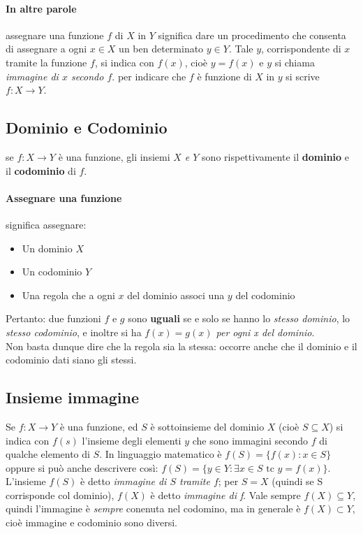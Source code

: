 \documentclass[12pt, a4paper, openany]{book}
\begin{document}
\paragraph{In altre parole} assegnare una funzione $f$ di $X$ in $Y$ significa dare un procedimento che consenta di assegnare a ogni $x \in X$ un ben determinato $y \in Y$. Tale $y$, corrispondente di $x$ tramite la funzione $f$, si indica con $f(x)$, cioè $y = f(x)$ e $y$ si chiama \emph{immagine di $x$ secondo $f$}. per indicare che $f$ è funzione di $X$ in $y$ si scrive $f: X \rightarrow Y$.

\subsection{Dominio e Codominio}
se $f: X \rightarrow Y$ è una funzione, gli insiemi \emph{$X$ e $Y$} sono rispettivamente il \textbf{dominio} e il \textbf{codominio} di $f$.
\paragraph{Assegnare una funzione} significa assegnare:
\begin{itemize}
    \item Un dominio $X$
    \item Un codominio $Y$
    \item Una regola che a ogni $x$ del dominio associ una $y$ del codominio
\end{itemize}
Pertanto: due funzioni $f$ e $g$ sono \textbf{uguali} se e solo se hanno lo \emph{stesso dominio}, lo\emph{ stesso codominio}, e inoltre si ha \emph{$f(x) = g(x)$ per ogni x del dominio}.\\
Non basta dunque dire che la regola sia la stessa: occorre anche che il dominio e il codominio dati siano gli stessi.

\subsection{Insieme immagine}
Se $f: X \rightarrow Y$ è una funzione, ed $S$ è sottoinsieme del dominio $X$ (cioè $S \subseteq X$) si indica con $f(s)$ l'insieme degli elementi $y$ che sono immagini secondo $f$ di qualche elemento di $S$.
In linguaggio matematico è $f(S) = \{ f(x) : x \in S\}$ oppure si può anche descrivere così: $f(S) = \{y \in Y : \exists x \in S \text{ tc } y = f(x)\}$.
L'insieme $f(S)$ è detto \emph{immagine di $S$ tramite $f$}; per $S = X$ (quindi se S corrisponde col dominio), $f(X)$ è detto \emph{immagine di f}. 
Vale sempre $f(X) \subseteq Y$, quindi l'immagine è \emph{sempre} conenuta nel codomino, ma in generale è $f(X) \subset Y$, cioè immagine e codominio sono diversi.
\end{document}
